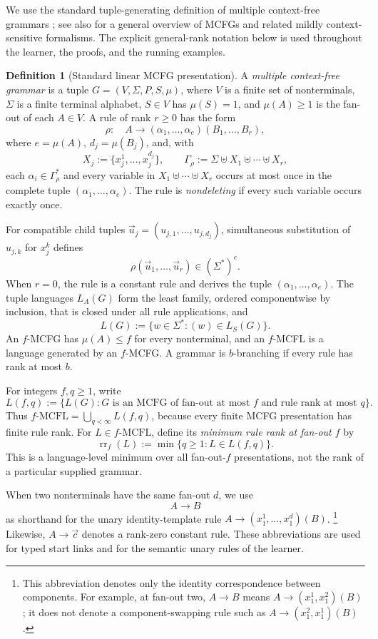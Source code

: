 \documentclass[11pt,a4paper]{article}
\numberwithin{equation}{section}
\theoremstyle{plain}
\theoremstyle{definition}
\newtheorem{definition}[theorem]{Definition}
\theoremstyle{remark}
\newcommand{\tuple}[1]{\vec{#1}}
\begin{document}
We use the standard tuple-generating definition of multiple context-free
grammars \cite{SekiEtAl1991}; see also \cite{Kallmeyer2010} for a general
overview of MCFGs and related mildly context-sensitive formalisms.
The explicit general-rank notation below is used throughout the learner, the
proofs, and the running examples.

\begin{definition}[Standard linear MCFG presentation]
\label{def:standard-mcfg}
A \emph{multiple context-free grammar} is a tuple
\(G=(V,\Sigma,P,S,\mu)\), where \(V\) is a finite set of nonterminals,
\(\Sigma\) is a finite terminal alphabet, \(S\in V\) has \(\mu(S)=1\), and
\(\mu(A)\ge1\) is the fan-out of each \(A\in V\).  A rule of rank \(r\ge0\)
has the form
\[
  \rho:\quad
  A\to(\alpha_1,\ldots,\alpha_e)(B_1,\ldots,B_r),
\]
where \(e=\mu(A)\), \(d_j=\mu(B_j)\), and, with
\[
  X_j:=\{x_j^1,\ldots,x_j^{d_j}\},
  \qquad
  \Gamma_\rho:=\Sigma\uplus X_1\uplus\cdots\uplus X_r,
\]
each \(\alpha_i\in\Gamma_\rho^*\) and every variable in
\(X_1\uplus\cdots\uplus X_r\) occurs at most once in the complete tuple
\((\alpha_1,\ldots,\alpha_e)\).  The rule is \emph{nondeleting} if every such
variable occurs exactly once.

For compatible child tuples
\(\tuple u_j=(u_{j,1},\ldots,u_{j,d_j})\), simultaneous substitution of
\(u_{j,k}\) for \(x_j^k\) defines
\[
  \rho(\tuple u_1,\ldots,\tuple u_r)\in(\Sigma^*)^e.
\]
When \(r=0\), the rule is a constant rule and derives the tuple
\((\alpha_1,\ldots,\alpha_e)\).  The tuple languages \(L_A(G)\) form the least family, ordered componentwise by
inclusion, that is closed under all rule applications, and
\[
  L(G):=\{w\in\Sigma^*:(w)\in L_S(G)\}.
\]
An \(f\)-MCFG has \(\mu(A)\le f\) for every nonterminal, and an \(f\)-MCFL is
a language generated by an \(f\)-MCFG.  A grammar is \(b\)-branching if every
rule has rank at most \(b\).
\end{definition}

For integers \(f,q\ge1\), write
\[
  L(f,q):=\{L(G):G\text{ is an MCFG of fan-out at most }f
  \text{ and rule rank at most }q\}.
\]
Thus \(f\text{-}\mathrm{MCFL}=\bigcup_{q<\infty}L(f,q)\), because every
finite MCFG presentation has finite rule rank.
For \(L\in f\text{-}\mathrm{MCFL}\), define its \emph{minimum rule rank at
fan-out \(f\)} by
\[
  \operatorname{rr}_f(L)
  :=\min\{q\ge1:L\in L(f,q)\}.
\]
This is a language-level minimum over all fan-out-\(f\) presentations, not
the rank of a particular supplied grammar.


When two nonterminals have the same fan-out \(d\), we use
\[
  A\to B
\]
as shorthand for the unary identity-template rule
\(A\to(x_1^1,\ldots,x_1^d)(B)\).%
\footnote{This abbreviation denotes only the identity correspondence between
components.  For example, at fan-out two, \(A\to B\) means
\(A\to(x_1^1,x_1^2)(B)\); it does not denote a component-swapping rule such as
\(A\to(x_1^2,x_1^1)(B)\).}
Likewise, \(A\to\tuple c\) denotes a rank-zero
constant rule.  These abbreviations are used for typed start links and for the
semantic unary rules of the learner.
\end{document}
